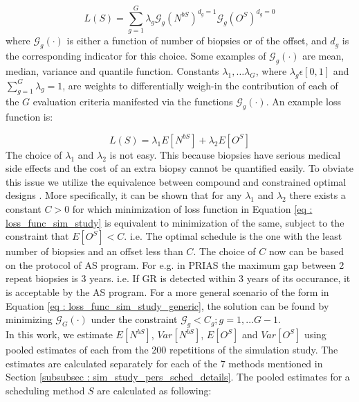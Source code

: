 \begin{equation}
\label{eq : loss_func_sim_study_generic}
L(S) = \sum_{g=1}^G \lambda_g \mathcal{G}_g(N^{bS})^{d_g=1}\mathcal{G}_g(O^S)^{d_g=0}
\end{equation}
where $\mathcal{G}_g(\cdot)$ is either a function of number of biopsies or of the offset, and $d_g$ is the corresponding indicator for this choice. Some examples of $\mathcal{G}_g(\cdot)$ are mean, median, variance and quantile function. Constants $\lambda_1, \ldots \lambda_G$, where $\lambda_g \epsilon [0,1]$ and $\sum_{g=1}^G \lambda_g = 1$, are weights to differentially weigh-in the contribution of each of the $G$ evaluation criteria manifested via the functions $\mathcal{G}_g(\cdot)$. An example loss function is:

\begin{equation}
\label{eq : loss_func_sim_study}
L(S) = \lambda_1 E[N^{bS}] + \lambda_2 E[O^S] 
\end{equation}
The choice of $\lambda_1$ and $\lambda_2$ is not easy. This because biopsies have serious medical side effects and the cost of an extra biopsy cannot be quantified easily. To obviate this issue we utilize the equivalence between compound and constrained optimal designs \citep{cook1994equivalence}. More specifically, it can be shown that for any $\lambda_1$ and $\lambda_2$ there exists a constant $C>0$ for which minimization of loss function in Equation \ref{eq : loss_func_sim_study} is equivalent to minimization of the same, subject to the constraint that $E[O^S] < C$. i.e. The optimal schedule is the one with the least number of biopsies and an offset less than $C$. The choice of $C$ now can be based on the protocol of AS program. For e.g. in PRIAS the maximum gap between 2 repeat biopsies is 3 years. i.e. If GR is detected within 3 years of its occurance, it is acceptable by the AS program. For a more general scenario of the form in Equation \ref{eq : loss_func_sim_study_generic}, the solution can be found by minimizing $\mathcal{G}_G(\cdot)$ under the constraint $\mathcal{G}_g < C_g; g=1, \ldots G-1$.\\

In this work, we estimate $E[N^{bS}]$, $Var[N^{bS}]$, $E[O^S]$ and $Var[O^S]$ using pooled estimates of each from the 200 repetitions of the simulation study. The estimates are calculated separately for each of the 7 methods mentioned in Section \ref{subsubsec : sim_study_pers_sched_details}. The pooled estimates for a scheduling method $S$ are calculated as following:

